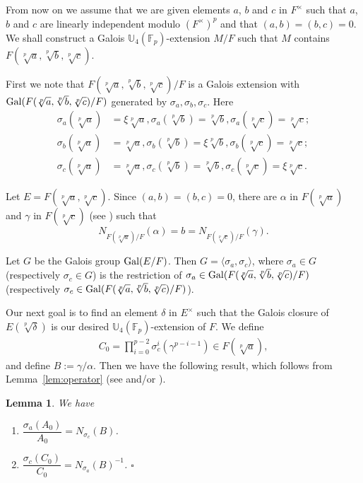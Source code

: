 \documentclass[12pt,leqno]{amsart}
\theoremstyle{plain}
\newtheorem{lem}[thm]{Lemma}
\theoremstyle{definition}
\newcommand{\F}{{\mathbb F}}
\newcommand{\U}{{\mathbb U}}
\newcommand*{\QEDB}{\hfill\ensuremath{\square}}
\begin{document}
From now on we assume that we are given  elements $a$, $b$ and $c$ in $F^\times$ such that 
 $a$, $b$ and $c$ are linearly independent modulo $(F^\times)^p$ and that 
  $(a,b)=(b,c)=0$. We shall construct a Galois $\U_4(\F_p)$-extension $M/F$ such that $M$ contains $F(\sqrt[p]{a},\sqrt[p]{b},\sqrt[p]{c})$.

First we note that  $F(\sqrt[p]{a},\sqrt[p]{b},\sqrt[p]{c})/F$ is a Galois extension with ${\rm Gal}(F(\sqrt[p]{a},\sqrt[p]{b},\sqrt[p]{c})/F)$ generated by $\sigma_a,\sigma_b,\sigma_c$. Here
\[
\begin{aligned}
\sigma_a(\sqrt[p]{a})&=\xi \sqrt[p]{a}, \sigma_a(\sqrt[p]{b})=\sqrt[p]{b}, \sigma_a(\sqrt[p]{c})=\sqrt[p]{c};\\
\sigma_b(\sqrt[p]{a})&=\sqrt[p]{a}, \sigma_b(\sqrt[p]{b})=\xi \sqrt[p]{b}, \sigma_b(\sqrt[p]{c})= \sqrt[p]{c};\\
\sigma_c(\sqrt[p]{a})&=\sqrt[p]{a}, \sigma_c(\sqrt[p]{b})=\sqrt[p]{b}, \sigma_c(\sqrt[p]{c})=\xi \sqrt[p]{c}.
\end{aligned}
\]

Let $E= F(\sqrt[p]{a},\sqrt[p]{c})$. Since $(a,b)=(b,c)=0$, there are $\alpha$ in $F(\sqrt[p]{a})$ and $\gamma$ in $F(\sqrt[p]{c})$ (see  \cite[Chapter XIV, Proposition 4 (iii)]{Se}) such that
\[
N_{F(\sqrt[p]{a})/F}(\alpha)=b=N_{F(\sqrt[p]{c})/F}(\gamma).
\]

Let $G$ be the Galois group ${\rm Gal}(E/F)$. Then $G=\langle \sigma_a,\sigma_c \rangle $, where $\sigma_a\in G$ (respectively $\sigma_c\in G$) is the restriction of $\sigma_a\in {\rm Gal}(F(\sqrt[p]{a},\sqrt[p]{b},\sqrt[p]{c})/F)$ (respectively $\sigma_c\in {\rm Gal}(F(\sqrt[p]{a},\sqrt[p]{b},\sqrt[p]{c})/F)$).

Our next goal is to find an element $\delta$ in $E^\times$ such that the Galois closure of  $E(\sqrt[p]{\delta})$ is our desired $\U_4(\F_p)$-extension of $F$.
We define 
\[
\begin{aligned}
C_0=\prod_{i=0}^{p-2} \sigma_c^{i}(\gamma^{p-i-1}) \in  F(\sqrt[p]{a}),
\end{aligned}
\] 
and define $B:=\gamma/\alpha$. Then we have the following result, which follows from Lemma~\ref{lem:operator} (see \cite[Proposition 3.2]{Ma} and/or \cite[Lemma 4.2]{MT5}). 
\begin{lem}
\label{lem:operators}
 We have
\begin{enumerate}
\item $\dfrac{\sigma_a(A_0)}{A_0}=N_{\sigma_c}(B)$.
\item $\dfrac{\sigma_c(C_0)}{C_0}=N_{\sigma_a}(B)^{-1}$.
\QEDB
\end{enumerate}
\end{lem}
\end{document}
